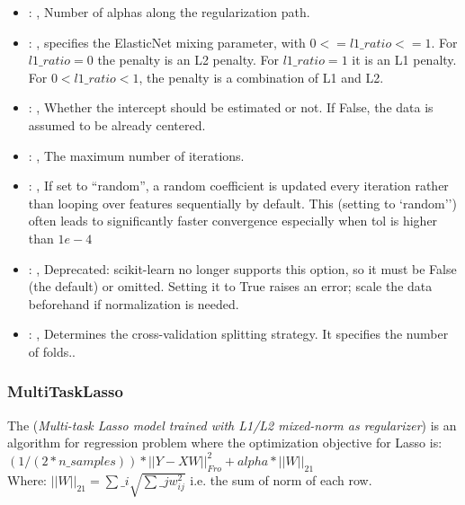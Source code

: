 \begin{itemize}
    \item {}: ,
      Number of alphas along the regularization path.

    \item {}: ,
      specifies the                                                  ElasticNet mixing parameter,
      with $0 <= l1\_ratio <= 1$.                                                  For $l1\_ratio =
      0$ the penalty is an L2 penalty.                                                  For
      $l1\_ratio = 1$ it is an L1 penalty.                                                  For $0 <
      l1\_ratio < 1$, the penalty is a combination of L1 and L2.

    \item {}: ,
      Whether the intercept should be estimated or not. If False,
      the data is assumed to be already centered.

    \item {}: ,
      The maximum number of iterations.

    \item {}: ,
      If set to ``random'', a random coefficient is updated every iteration
      rather than looping over features sequentially by default. This (setting to `random'')
      often leads to significantly faster convergence especially when tol is higher than $1e-4$

    \item {}: ,
      Deprecated: scikit-learn no longer supports this option, so it must be False (the default) or
      omitted.                                                  Setting it to True raises an error;
      scale the data beforehand if normalization is needed.

    \item {}: ,
      Determines the cross-validation splitting strategy.
      It specifies the number of folds..
  \end{itemize}


\subsubsection{MultiTaskLasso}
  The  (\textit{Multi-task Lasso model trained                         with
  L1/L2 mixed-norm as regularizer}) is an algorithm for regression problem
  where the optimization objective for Lasso is:                         $(1 / (2 * n\_samples)) *
  ||Y - XW||^2_{Fro} + alpha * ||W||_{21}$                         \\Where:
  $||W||_{21} = \sum\_i \sqrt{\sum\_j w_{ij}^2}$                         i.e. the sum of norm of each
  row.                         


